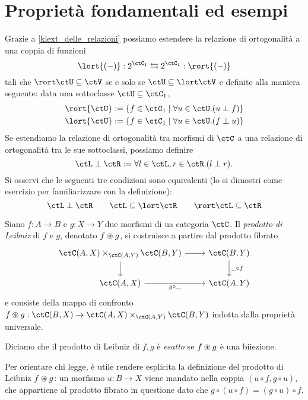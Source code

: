 \section[Proprietà ed esempi]{Proprietà fondamentali ed esempi}
\begin{remark}
	Grazie a \ref{klext_delle_relazioni} possiamo estendere la relazione di ortogonalità a una coppia di funzioni
	\[\lort{(-)} : 2^{\ctC_1} \leftrightarrows 2^{\ctC_1} : \rort{(-)}\]
	tali che \(\rort\ctU\subseteq\ctV\) se e solo se \(\ctU\subseteq\lort\ctV\) e definite alla maniera seguente: data una sottoclasse \(\ctU\subseteq \ctC_1\),
	\begin{gather*}
		\rort{\ctU} := \{f\in\ctC_1\mid \forall u\in\ctU.(u\perp f)\}\\
		\lort{\ctU} := \{f\in\ctC_1\mid \forall u\in\ctU.(f\perp u)\}
	\end{gather*}
	Se estendiamo la relazione di ortogonalità tra morfismi di \(\ctC\) a una relazione di ortogonalità tra le sue sottoclassi, possiamo definire
	\[\ctL\perp \ctR := \forall l\in\ctL,r\in\ctR.(l\perp r).\]
	Si osservi che le seguenti tre condizioni sono equivalenti (lo si dimostri come esercizio per familiarizzare con la definizione):
	\[\ctL\perp\ctR\qquad \ctL\subseteq\lort\ctR\qquad \rort\ctL\subseteq \ctR\]
\end{remark}
\begin{definition}
	Siano \(f : A \to B\) e \(g : X\to Y\) due morfismi di ua categoria \(\ctC\). Il \emph{prodotto di Leibniz} di \(f\) e \(g\), denotato \(f\oast g\), si costruisce a partire dal prodotto fibrato
	\[
		\begin{tikzcd}
			\pull {\ctC(A,X)}{\ctC(B,Y)}{\ctC(A,Y)} \ar[r]\ar[d] & \ctC(B,Y) \ar[d, "\_\circ f"]\\
			\ctC(A,X) \ar[r, "g\circ\_"'] & \ctC(A,Y)
		\end{tikzcd}
	\]
	e consiste della mappa di confronto \(f\oast g : \ctC(B,X) \to \pull {\ctC(A,X)}{\ctC(B,Y)}{\ctC(A,Y)}\) indotta dalla proprietà universale.

	Diciamo che il prodotto di Leibniz di \(f,g\) è \emph{esatto} se \(f\oast g\) è una biiezione.
\end{definition}
Per orientare chi legge, è utile rendere esplicita la definizione del prodotto di Leibniz \(f\oast g\): un morfismo \(u : B\to X\) viene mandato nella coppia \((u\circ f, g\circ u)\), che appartiene al prodotto fibrato in questione dato che \(g\circ (u\circ f) = (g\circ u)\circ f\).

